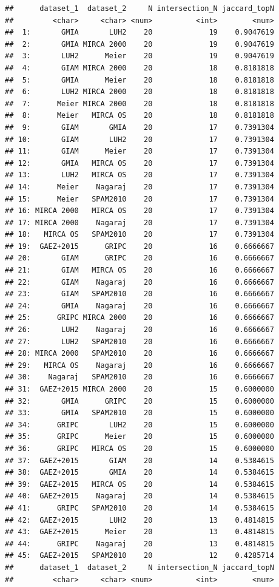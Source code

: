 \documentclass[
  11pt,
]{article}
\begin{document}
\begin{verbatim}
##      dataset_1  dataset_2     N intersection_N jaccard_topN
##         <char>     <char> <num>          <int>        <num>
##  1:       GMIA       LUH2    20             19    0.9047619
##  2:       GMIA MIRCA 2000    20             19    0.9047619
##  3:       LUH2      Meier    20             19    0.9047619
##  4:       GIAM MIRCA 2000    20             18    0.8181818
##  5:       GMIA      Meier    20             18    0.8181818
##  6:       LUH2 MIRCA 2000    20             18    0.8181818
##  7:      Meier MIRCA 2000    20             18    0.8181818
##  8:      Meier   MIRCA OS    20             18    0.8181818
##  9:       GIAM       GMIA    20             17    0.7391304
## 10:       GIAM       LUH2    20             17    0.7391304
## 11:       GIAM      Meier    20             17    0.7391304
## 12:       GMIA   MIRCA OS    20             17    0.7391304
## 13:       LUH2   MIRCA OS    20             17    0.7391304
## 14:      Meier    Nagaraj    20             17    0.7391304
## 15:      Meier   SPAM2010    20             17    0.7391304
## 16: MIRCA 2000   MIRCA OS    20             17    0.7391304
## 17: MIRCA 2000    Nagaraj    20             17    0.7391304
## 18:   MIRCA OS   SPAM2010    20             17    0.7391304
## 19:  GAEZ+2015      GRIPC    20             16    0.6666667
## 20:       GIAM      GRIPC    20             16    0.6666667
## 21:       GIAM   MIRCA OS    20             16    0.6666667
## 22:       GIAM    Nagaraj    20             16    0.6666667
## 23:       GIAM   SPAM2010    20             16    0.6666667
## 24:       GMIA    Nagaraj    20             16    0.6666667
## 25:      GRIPC MIRCA 2000    20             16    0.6666667
## 26:       LUH2    Nagaraj    20             16    0.6666667
## 27:       LUH2   SPAM2010    20             16    0.6666667
## 28: MIRCA 2000   SPAM2010    20             16    0.6666667
## 29:   MIRCA OS    Nagaraj    20             16    0.6666667
## 30:    Nagaraj   SPAM2010    20             16    0.6666667
## 31:  GAEZ+2015 MIRCA 2000    20             15    0.6000000
## 32:       GMIA      GRIPC    20             15    0.6000000
## 33:       GMIA   SPAM2010    20             15    0.6000000
## 34:      GRIPC       LUH2    20             15    0.6000000
## 35:      GRIPC      Meier    20             15    0.6000000
## 36:      GRIPC   MIRCA OS    20             15    0.6000000
## 37:  GAEZ+2015       GIAM    20             14    0.5384615
## 38:  GAEZ+2015       GMIA    20             14    0.5384615
## 39:  GAEZ+2015   MIRCA OS    20             14    0.5384615
## 40:  GAEZ+2015    Nagaraj    20             14    0.5384615
## 41:      GRIPC   SPAM2010    20             14    0.5384615
## 42:  GAEZ+2015       LUH2    20             13    0.4814815
## 43:  GAEZ+2015      Meier    20             13    0.4814815
## 44:      GRIPC    Nagaraj    20             13    0.4814815
## 45:  GAEZ+2015   SPAM2010    20             12    0.4285714
##      dataset_1  dataset_2     N intersection_N jaccard_topN
##         <char>     <char> <num>          <int>        <num>
\end{verbatim}
\end{document}
